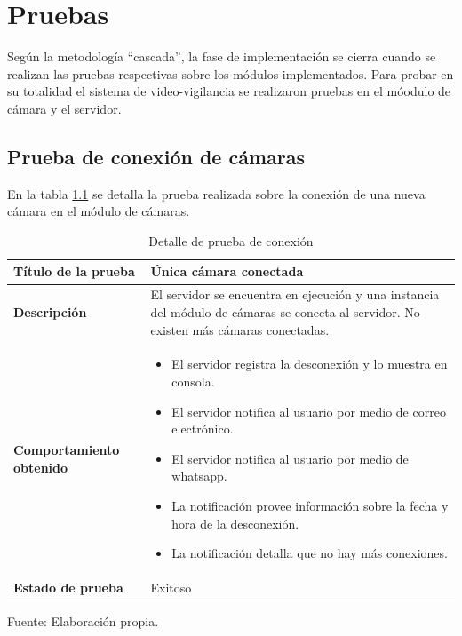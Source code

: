 \chapter{Pruebas}

Según la metodología ``cascada'', la fase de implementación se cierra cuando se realizan las pruebas respectivas sobre los módulos implementados. Para probar en su totalidad el sistema de video-vigilancia se realizaron pruebas en el móodulo de cámara y el servidor.\\

\section{Prueba de conexión de cámaras}
En la tabla \ref{con_modulo_cameras} se detalla la prueba realizada sobre la conexión de una nueva cámara en el módulo de cámaras.

\begin{table}[H]
    \caption{Detalle de prueba de conexión}
    \label{con_modulo_cameras}
    \begin{center}
        \begin{tabular}{|>{\centering}p{}|m{}<{\centering}|} 
            \hline
            \textbf{Título de la prueba} & \textbf{Única cámara conectada} \\
            \hline
            \textbf{Descripción} & El servidor se encuentra en ejecución y una instancia del módulo de cámaras se conecta al servidor. No existen más cámaras conectadas.\\
            \hline
            \textbf{Comportamiento obtenido} & 
            \begin{itemize}
                \item El servidor registra la desconexión y lo muestra en consola.
                \item El servidor notifica al usuario por medio de correo electrónico.
                \item El servidor notifica al usuario por medio de whatsapp.
                \item La notificación provee información sobre la fecha y hora de la desconexión.
                \item La notificación detalla que no hay más conexiones.
            \end{itemize} \\ 
            \hline
            \textbf{Estado de prueba} & Exitoso \\
            \hline
        \end{tabular}
        \begin{center}
            Fuente: Elaboración propia.
        \end{center}
    \end{center}
\end{table}

